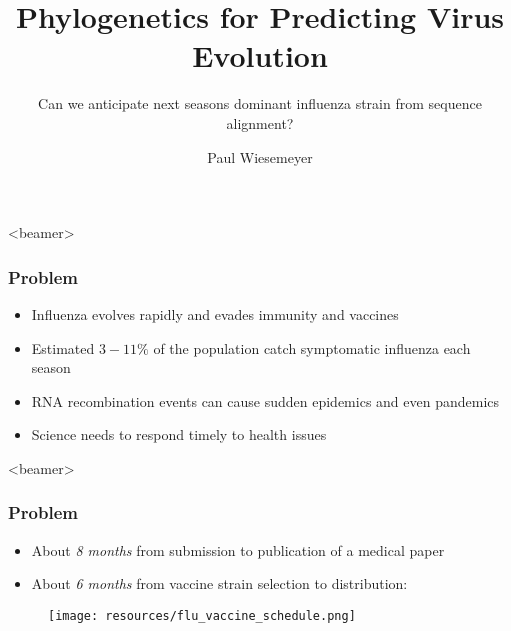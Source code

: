 \documentclass{beamer}
\title{Phylogenetics for Predicting Virus Evolution}
\subtitle{Can we anticipate next seasons dominant influenza strain from sequence alignment?}
\author{Paul Wiesemeyer}
\begin{document}
  \shorthandoff{-}
  \frame{\maketitle}

  
    
  \begin{darkframes}




  \begin{frame}<beamer>
    \frametitle{Problem}


    \begin{itemize}
      \item Influenza evolves rapidly and evades immunity and vaccines
      \item Estimated $3 - 11 \% $ of the population catch symptomatic influenza each season \cite{tokarsOlsen+18a}
      \item RNA recombination events can cause sudden epidemics and even pandemics
      \item Science needs to respond timely to health issues
    \end{itemize}
  \end{frame}

  \begin{frame}<beamer>
    \frametitle{Problem}
    \begin{itemize}
      \item About \textit{8 months} from submission to publication of a medical paper \cite{aAMC18}
      \item About \textit{6 months} from vaccine strain selection to distribution:
    \end{itemize}
    \begin{figure}
        \texttt{[image: resources/flu\_vaccine\_schedule.png]}
        \caption{\cite{bedford15}}
    \end{figure}{}
  \end{frame}






\end{darkframes}
\end{document}
